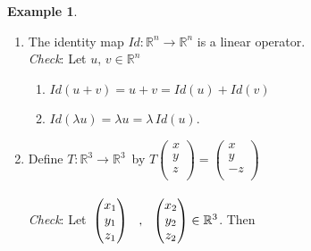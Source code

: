 \documentclass[11pt,a4paper]{article}
\theoremstyle{definition}
\newtheorem{exa}[thm]{Example}
\begin{document}
\begin{exa}
\begin{enumerate}
\item The identity map $Id : \mathbb{R}^n \longrightarrow \mathbb{R}^n$ is a linear operator.\\

\textit{Check}: Let $u,\, v\in \mathbb{R}^n$
\begin{enumerate}
        \item[(i)] $Id (u + v) = u + v = Id(u) + Id (v)$
        \item[(ii)] $Id(\lambda u) = \lambda u = \lambda\, Id(u)$.\\
\end{enumerate}


\item Define $T: \mathbb{R}^3 \longrightarrow \mathbb{R}^3\,$ by $T\begin{pmatrix}
x\\
y\\
z\\
\end{pmatrix} = \begin{pmatrix}
x\\
y\\
-z\\
\end{pmatrix}$\\\\



\textit{Check}: Let $\, \begin{pmatrix}
x_1\\
y_1\\
z_1\\
\end{pmatrix}\, \hspace{0.2cm} , \, \hspace{0.2cm} \begin{pmatrix}
x_2\\
y_2\\
z_2\\
\end{pmatrix} \in \mathbb{R}^3$. Then 


\end{enumerate}
\end{exa}
\end{document}
